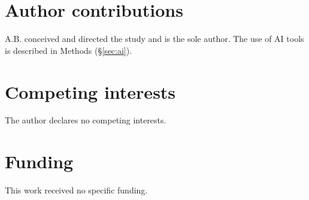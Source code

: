 \documentclass[11pt]{article}
\begin{document}
\section*{Author contributions}
A.B. conceived and directed the study and is the sole author. The use of AI tools is
described in Methods (\S\ref{sec:ai}).

\section*{Competing interests}
The author declares no competing interests.

\section*{Funding}
This work received no specific funding.
\end{document}
